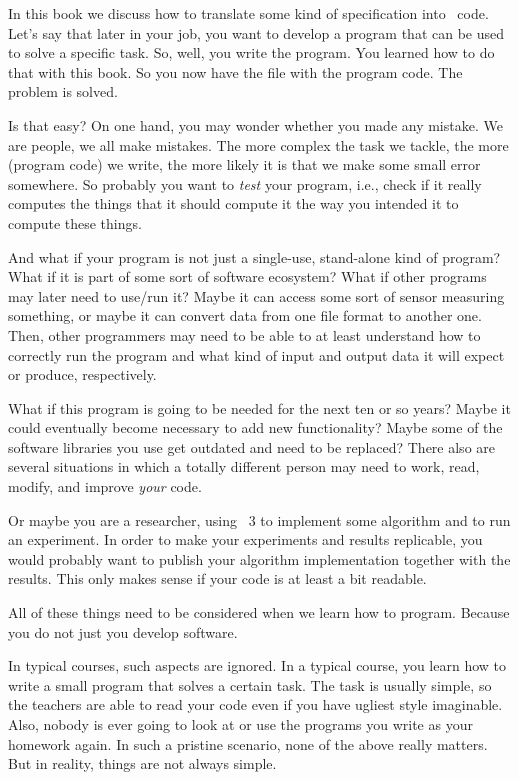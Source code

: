 In this book we discuss how to translate some kind of specification into \python\ code.
Let's say that later in your job, you want to develop a program that can be used to solve a specific task.
So, well, you write the program.
You learned how to do that with this book.
So you now have the file with the program code.
The problem is solved.

Is that easy?
On one hand, you may wonder whether you made any mistake.
We are people, we all make mistakes.
The more complex the task we tackle, the more (program code) we write, the more likely it is that we make some small error somewhere.
So probably you want to \emph{test} your program, i.e., check if it really computes the things that it should compute it the way you intended it to compute these things.

And what if your program is not just a single-use, stand-alone kind of program?
What if it is part of some sort of software ecosystem?
What if other programs may later need to use/run it?
Maybe it can access some sort of sensor measuring something, or maybe it can convert data from one file format to another one.
Then, other programmers may need to be able to at least understand how to correctly run the program and what kind of input and output data it will expect or produce, respectively.

What if this program is going to be needed for the next ten or so years?
Maybe it could eventually become necessary to add new functionality?
Maybe some of the software libraries you use get outdated and need to be replaced?
There also are several situations in which a totally different person may need to work, read, modify, and improve \emph{your} code.

Or maybe you are a researcher, using \python~3 to implement some algorithm and to run an experiment.
In order to make your experiments and results replicable, you would probably want to publish your algorithm implementation together with the results.
This only makes sense if your code is at least a bit readable.

All of these things need to be considered when we learn how to program.
Because you do not just  you develop software.

In typical courses, such aspects are ignored.
In a typical course, you learn how to write a small program that solves a certain task.
The task is usually simple, so the teachers are able to read your code even if you have ugliest style imaginable.
Also, nobody is ever going to look at or use the programs you write as your homework again.
In such a pristine scenario, none of the above really matters.
But in reality, things are not always simple.

